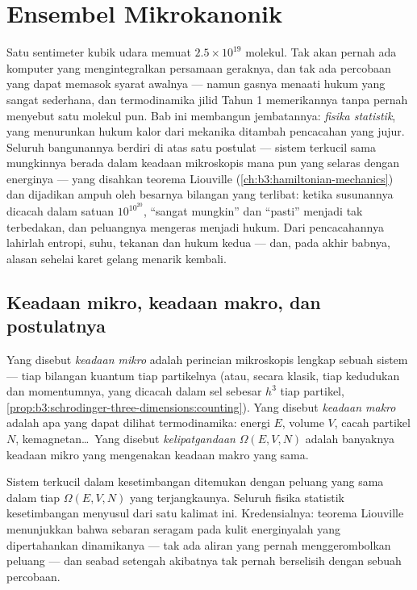 \chapter{Ensembel Mikrokanonik}\label{ch:b3:microcanonical-ensemble}

Satu sentimeter kubik udara memuat $2.5\times10^{19}$ molekul. Tak akan
pernah ada komputer yang mengintegralkan persamaan geraknya, dan tak ada
percobaan yang dapat memasok syarat awalnya --- namun gasnya menaati
hukum yang sangat sederhana, dan termodinamika jilid Tahun 1 memerikannya
tanpa pernah menyebut satu molekul pun. Bab ini membangun jembatannya:
\emph{fisika statistik}, yang menurunkan hukum kalor dari mekanika
ditambah pencacahan yang jujur. Seluruh bangunannya berdiri di atas satu
postulat --- sistem terkucil sama mungkinnya berada dalam keadaan
mikroskopis mana pun yang selaras dengan energinya --- yang disahkan
teorema Liouville (\cref{ch:b3:hamiltonian-mechanics}) dan dijadikan
ampuh oleh besarnya bilangan yang terlibat: ketika susunannya dicacah
dalam satuan $10^{10^{20}}$, ``sangat mungkin'' dan ``pasti'' menjadi tak
terbedakan, dan peluangnya mengeras menjadi hukum. Dari pencacahannya
lahirlah entropi, suhu, tekanan dan hukum kedua --- dan, pada akhir
babnya, alasan sehelai karet gelang menarik kembali.

\section{Keadaan mikro, keadaan makro, dan postulatnya}

\begin{definition}\label{def:b3:microcanonical-ensemble:states}
Yang disebut \emph{keadaan mikro} adalah perincian mikroskopis lengkap
sebuah sistem --- tiap bilangan kuantum tiap partikelnya (atau, secara
klasik, tiap kedudukan dan momentumnya, yang dicacah dalam sel  sebesar $h^3$ tiap partikel,
\cref{prop:b3:schrodinger-three-dimensions:counting}). Yang disebut
\emph{keadaan makro} adalah apa yang dapat dilihat termodinamika: energi
$E$, volume $V$, cacah partikel $N$, kemagnetan\dots\ Yang disebut
\emph{kelipatgandaan} $\Omega(E, V, N)$ adalah banyaknya keadaan mikro
yang mengenakan keadaan makro yang sama.
\end{definition}

\begin{theorem}\label{thm:b3:microcanonical-ensemble:postulate}
Sistem terkucil dalam kesetimbangan ditemukan dengan peluang yang sama
dalam tiap $\Omega(E, V, N)$  yang terjangkaunya. Seluruh
fisika statistik kesetimbangan menyusul dari satu kalimat ini.
Kredensialnya: teorema Liouville menunjukkan bahwa sebaran seragam pada
kulit energinyalah yang dipertahankan dinamikanya --- tak ada aliran yang
pernah menggerombolkan peluang  --- dan seabad setengah
akibatnya tak pernah berselisih dengan sebuah percobaan.
\end{theorem}
\admitted

